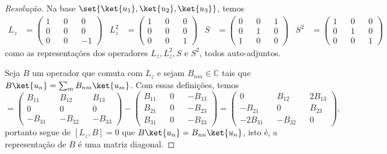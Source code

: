 \begin{proof}[Resolução]
    Na base \(\set{\ket{u_1}, \ket{u_2}, \ket{u_3}}\), temos
    \begin{align*}
        L_z &= \begin{pmatrix}
            1 && 0 && 0\\
            0 && 0 && 0\\
            0 && 0 &&-1
        \end{pmatrix}&
        L_z^2 &= \begin{pmatrix}
            1 && 0 && 0\\
            0 && 0 && 0\\
            0 && 0 && 1
        \end{pmatrix}&
        S &= \begin{pmatrix}
            0 && 0 && 1\\
            0 && 1 && 0\\
            1 && 0 && 0
        \end{pmatrix}&
        S^2 &= \begin{pmatrix}
            1 && 0 && 0\\
            0 && 1 && 0\\
            0 && 0 && 1
        \end{pmatrix}
    \end{align*}
    como as representações dos operadores \(L_z, L_z^2, S\) e \(S^2\), todos auto-adjuntos.

    Seja \(B\) um operador que comuta com \(L_z\) e sejam \(B_{nm} \in \mathbb{C}\) tais que \(B\ket{u_n} = \sum_{m} B_{nm}\ket{u_m}\). Com essas definições, temos
    \begin{equation*}
        [L_z, B] = \begin{pmatrix}
            B_{11} && B_{12} && B_{13}\\
            0 && 0 && 0\\
            -B_{31} && - B_{32} && -B_{33}
        \end{pmatrix} - \begin{pmatrix}
            B_{11} && 0 && -B_{13}\\
            B_{21} && 0 && -B_{23}\\
            B_{31} && 0 && -B_{33}
        \end{pmatrix} =
        \begin{pmatrix}
            0 && B_{12} && 2B_{13}\\
            -B_{21} && 0 && B_{23}\\
            -2B_{31} && -B_{32} && 0
        \end{pmatrix},
    \end{equation*}
    portanto segue de \([L_z,B] = 0\) que \(B\ket{u_n} = B_{nn} \ket{u_n}\), isto é, a representação de \(B\) é uma matriz diagonal.


\end{proof}
